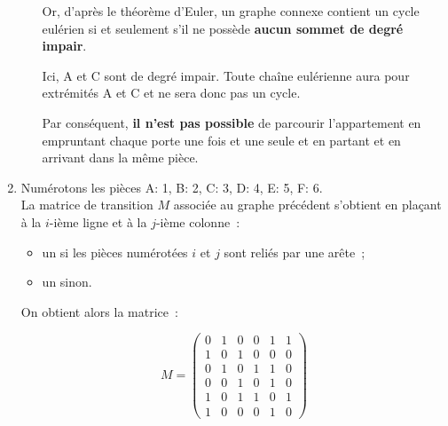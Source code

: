 \begin{corrige}
\begin{enumerate}
\begin{enumerate}[label=\alph*.]
               Or, d'après le théorème d'Euler, un graphe connexe contient un cycle eulérien si et seulement s'il ne possède \textbf{aucun sommet de degré impair}.
              
               Ici, A et C sont de degré impair. Toute chaîne eulérienne aura pour extrémités A et C et ne sera donc pas un cycle.
              
               Par conséquent, \textbf{il n'est pas possible} de parcourir l'appartement en empruntant chaque porte une fois et une seule et en partant et en arrivant dans la même pièce.
              
              
          \end{enumerate}
         
          \item %
          Numérotons les pièces A: 1, B: 2, C: 3, D: 4, E: 5, F: 6.\\
          La matrice de transition $M$ associée au graphe précédent s'obtient en plaçant à la $i$-ième ligne et à la $j$-ième colonne~:
          \begin{itemize}
               \item %
               un  \fg{} si les pièces numérotées $i$ et $j$ sont reliés par une arête~;
               \item %
               un  \fg{} sinon.
          \end{itemize}
         
          On obtient alors la matrice~:
         
          \[ M = \begin{pmatrix}
               0 &1 &0 &0 &1 &1 \\
               1 &0 &1 &0 &0 &0 \\
               0 &1 &0 &1 &1 &0 \\
               0 &0 &1 &0 &1 &0 \\
               1 &0 &1 &1 &0 &1\\
          1 &0 &0 &0 &1 &0  \end{pmatrix} \]
         

\end{enumerate}
\end{corrige}
